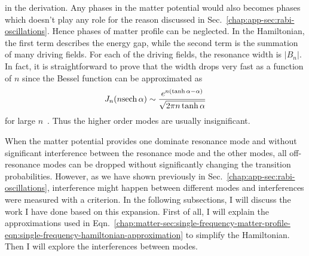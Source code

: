 in the derivation.
Any phases in the matter potential would also becomes phases which doesn't play any role for the reason discussed in Sec.~\ref{chap:app-sec:rabi-oscillations}. Hence phases of matter profile can be neglected. In the Hamiltonian, the first term describes the energy gap, while the second term is the summation of many driving fields. For each of the driving fields, the resonance width is $\lvert B_{n}\rvert$. In fact, it is straightforward to prove that the width drops very fast as a function of $n$ since the Bessel function can be approximated as
\begin{equation}
J_n(n {\operatorname{sech}{\alpha}}) \sim \frac{ e^{n(\tanh\alpha - \alpha)} }{\sqrt{ 2\pi n \tanh \alpha } }
\end{equation}
for large $n$~\cite{Ploumistakis20092897}. Thus the higher order modes are usually insignificant.


When the matter potential provides one dominate resonance mode and without significant interference between the resonance mode and the other modes, all off-resonance modes can be dropped without significantly changing the transition probabilities. However, as we have shown previously in Sec.~\ref{chap:app-sec:rabi-oscillations}, interference might happen between different modes and interferences were measured with a criterion. In the following subsections, I will discuss the work I have done based on this expansion. First of all, I will explain the approximations used in Eqn.~\ref{chap:matter-sec:single-frequency-matter-profile-eqn:single-frequency-hamiltonian-approximation} to simplify the Hamiltonian. Then I will explore the interferences between modes. 




